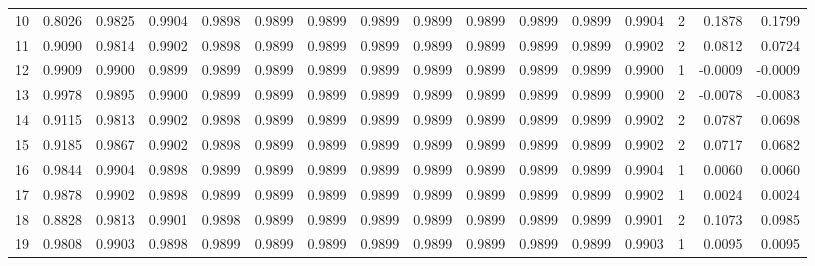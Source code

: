 \begin{tabular}{lrrrrrrrrrrrrrrr}
10 &      0.8026 &  0.9825 &  0.9904 &  0.9898 &  0.9899 &  0.9899 &  0.9899 &  0.9899 &  0.9899 &  0.9899 &   0.9899 &     0.9904 &      2 &                    0.1878 &                     0.1799 \\
11 &      0.9090 &  0.9814 &  0.9902 &  0.9898 &  0.9899 &  0.9899 &  0.9899 &  0.9899 &  0.9899 &  0.9899 &   0.9899 &     0.9902 &      2 &                    0.0812 &                     0.0724 \\
12 &      0.9909 &  0.9900 &  0.9899 &  0.9899 &  0.9899 &  0.9899 &  0.9899 &  0.9899 &  0.9899 &  0.9899 &   0.9899 &     0.9900 &      1 &                   -0.0009 &                    -0.0009 \\
13 &      0.9978 &  0.9895 &  0.9900 &  0.9899 &  0.9899 &  0.9899 &  0.9899 &  0.9899 &  0.9899 &  0.9899 &   0.9899 &     0.9900 &      2 &                   -0.0078 &                    -0.0083 \\
14 &      0.9115 &  0.9813 &  0.9902 &  0.9898 &  0.9899 &  0.9899 &  0.9899 &  0.9899 &  0.9899 &  0.9899 &   0.9899 &     0.9902 &      2 &                    0.0787 &                     0.0698 \\
15 &      0.9185 &  0.9867 &  0.9902 &  0.9898 &  0.9899 &  0.9899 &  0.9899 &  0.9899 &  0.9899 &  0.9899 &   0.9899 &     0.9902 &      2 &                    0.0717 &                     0.0682 \\
16 &      0.9844 &  0.9904 &  0.9898 &  0.9899 &  0.9899 &  0.9899 &  0.9899 &  0.9899 &  0.9899 &  0.9899 &   0.9899 &     0.9904 &      1 &                    0.0060 &                     0.0060 \\
17 &      0.9878 &  0.9902 &  0.9898 &  0.9899 &  0.9899 &  0.9899 &  0.9899 &  0.9899 &  0.9899 &  0.9899 &   0.9899 &     0.9902 &      1 &                    0.0024 &                     0.0024 \\
18 &      0.8828 &  0.9813 &  0.9901 &  0.9898 &  0.9899 &  0.9899 &  0.9899 &  0.9899 &  0.9899 &  0.9899 &   0.9899 &     0.9901 &      2 &                    0.1073 &                     0.0985 \\
19 &      0.9808 &  0.9903 &  0.9898 &  0.9899 &  0.9899 &  0.9899 &  0.9899 &  0.9899 &  0.9899 &  0.9899 &   0.9899 &     0.9903 &      1 &                    0.0095 &                     0.0095 \\
\bottomrule
\end{tabular}
